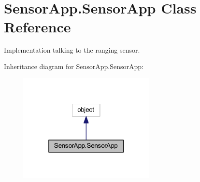 \hypertarget{class_sensor_app_1_1_sensor_app}{}\section{Sensor\+App.\+Sensor\+App Class Reference}
\label{class_sensor_app_1_1_sensor_app}


Implementation talking to the ranging sensor.  




Inheritance diagram for Sensor\+App.\+Sensor\+App\+:
\nopagebreak
\begin{figure}[H]
\begin{center}
\leavevmode
\includegraphics[width=196pt]{class_sensor_app_1_1_sensor_app__inherit__graph}
\end{center}
\end{figure}
